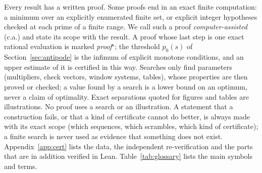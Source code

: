 Every result has a written proof. Some proofs end in an exact finite computation: a minimum over an explicitly enumerated finite set, or explicit integer hypotheses checked at each prime of a finite range. We call such a proof \emph{computer-assisted} (c.a.) and state its scope with the result. A proof whose last step is one exact rational evaluation is marked \emph{proof${}^\star$}; the threshold $p_0(s)$ of Section~\ref{sec:antipode} is the infimum of explicit monotone conditions, and an upper estimate of it is certified in this way. Searches only find parameters (multipliers, check vectors, window systems, tables), whose properties are then proved or checked; a value found by a search is a lower bound on an optimum, never a claim of optimality. Exact separations quoted for figures and tables are illustrations. No proof uses a search or an illustration. A statement that a construction fails, or that a kind of certificate cannot do better, is always made with its exact scope (which sequences, which scrambles, which kind of certificate); a finite search is never used as evidence that something does not exist. Appendix~\ref{app:cert} lists the data, the independent re-verification and the parts that are in addition verified in Lean. Table~\ref{tab:glossary} lists the main symbols and terms.


